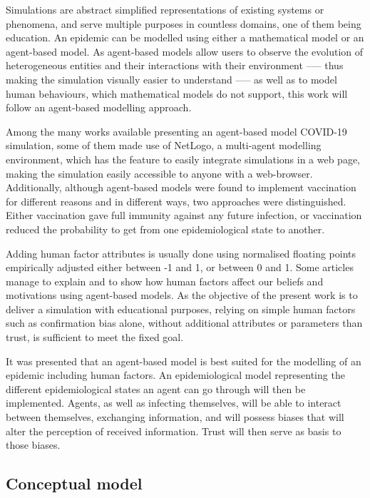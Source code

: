 Simulations are abstract simplified representations of existing systems or phenomena, and serve multiple purposes in countless domains, one of them being education. An epidemic can be modelled using either a mathematical model or an agent-based model. As agent-based models allow users to observe the evolution of heterogeneous entities and their interactions with their environment --— thus making the simulation visually easier to understand —-- as well as to model human behaviours, which mathematical models do not support, this work will follow an agent-based modelling approach.

Among the many works available presenting an agent-based model COVID-19 simulation, some of them made use of NetLogo, a multi-agent modelling environment, which has the feature to easily integrate simulations in a web page, making the simulation easily accessible to anyone with a web-browser. Additionally, although agent-based models were found to implement vaccination for different reasons and in different ways, two approaches were distinguished. Either vaccination gave full immunity against any future infection, or vaccination reduced the probability to get from one epidemiological state to another.

Adding human factor attributes is usually done using normalised floating points empirically adjusted either between -1 and 1, or between 0 and 1. Some articles manage to explain and to show how human factors affect our beliefs and motivations using agent-based models. As the objective of the present work is to deliver a simulation with educational purposes, relying on simple human factors such as confirmation bias alone, without additional attributes or parameters than trust, is sufficient to meet the fixed goal.

It was presented that an agent-based model is best suited for the modelling of an epidemic including human factors. An epidemiological model representing the different epidemiological states an agent can go through will then be implemented. Agents, as well as infecting themselves, will be able to interact between themselves, exchanging information, and will possess biases that will alter the perception of received information. Trust will then serve as basis to those biases.

\pagebreak

\subsection{Conceptual model}

